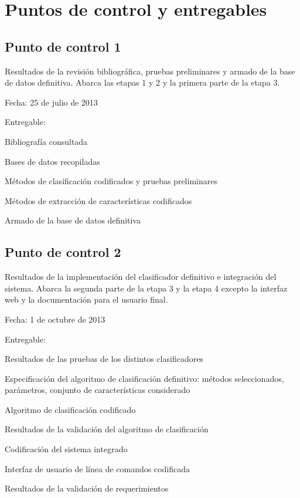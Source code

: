 \documentclass[12pt,bibliography=oldstyle,DIV=12,parskip=full-]{scrartcl}
\begin{document}
\section{Puntos de control y entregables}
\subsection{Punto de control 1}
Resultados de la revisión bibliográfica, pruebas preliminares y armado
de la base de datos definitiva.  Abarca las etapas 1 y 2 y la primera
parte de la etapa 3.
\begin{description*}
  \item[Fecha:] 25 de julio de 2013
  \item[Entregable:]
  \item
    \begin{minipage}{\textwidth}
      \medskip
      \begin{itemize*}
      \item Bibliografía consultada
      \item Bases de datos recopiladas
      \item Métodos de clasificación codificados y pruebas preliminares
      \item Métodos de extracción de características codificados
      \item Armado de la base de datos definitiva
      \end{itemize*}
    \end{minipage}
\end{description*}
\newpage
\subsection{Punto de control 2}
Resultados de la implementación del clasificador definitivo e
integración del sistema. Abarca la segunda parte de la etapa 3 y la
etapa 4 excepto la interfaz web y la documentación para el usuario
final.
\begin{description*}
  \item[Fecha:] 1 de octubre de 2013
  \item[Entregable:]
  \item
    \begin{minipage}{\textwidth}
      \medskip
      \begin{itemize*}
      \item Resultados de las pruebas de los distintos clasificadores
      \item Especificación del algoritmo de clasificación definitivo:
        métodos seleccionados, parámetros, conjunto de características
        considerado
      \item Algoritmo de clasificación codificado
      \item Resultados de la validación del algoritmo de clasificación
      \item Codificación del sistema integrado
      \item Interfaz de usuario de línea de comandos codificada
      \item Resultados de la validación de requerimientos
      \end{itemize*}
    \end{minipage}
\end{description*}
\end{document}
